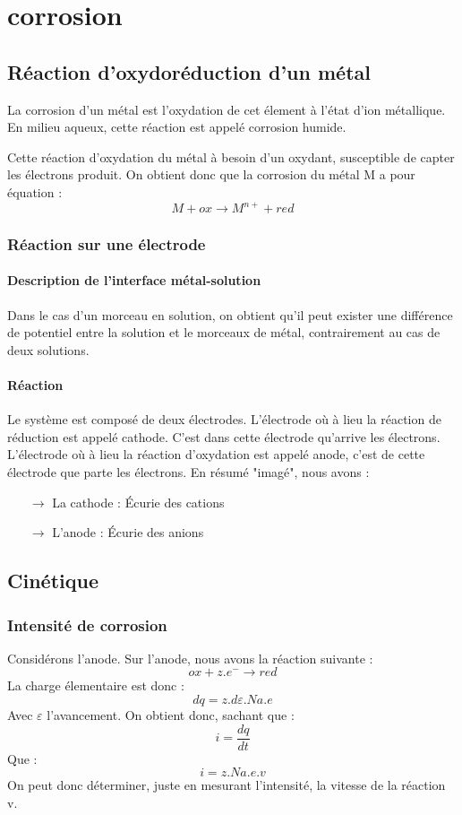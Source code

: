 \chapter{corrosion}
\section{Réaction d'oxydoréduction d'un métal}
\begin{de}
La corrosion d'un métal est l'oxydation de cet élement à l'état d'ion métallique. En milieu aqueux, cette réaction est appelé corrosion humide.
\end{de}
Cette réaction d'oxydation du métal à besoin d'un oxydant, susceptible de capter les électrons produit. On obtient donc que la corrosion du métal M a pour équation :
$$M + ox \rightarrow M^{n+} + red$$
\subsection{Réaction sur une électrode}
\subsubsection{Description de l'interface métal-solution}
Dans le cas d'un morceau en solution, on obtient qu'il peut exister une différence de potentiel entre la solution et le morceaux de métal, contrairement au cas de deux solutions.
\subsubsection{Réaction}
Le système est composé de deux électrodes. L'électrode où à lieu la réaction de réduction est appelé cathode. C'est dans cette électrode qu'arrive les électrons. L'électrode où à lieu la réaction d'oxydation est appelé anode, c'est de cette électrode que parte les électrons.
En résumé "imagé", nous avons : 
\begin{itemize}
 \item[$\rightarrow$] La cathode : Écurie des cations
 \item[$\rightarrow$] L'anode : Écurie des anions
\end{itemize}
\section{Cinétique}
\subsection{Intensité de corrosion}
Considérons l'anode. Sur l'anode, nous avons la réaction suivante : 
$$ox + z.e^- \rightarrow red$$
La charge élementaire est donc : 
$$dq = z.d\varepsilon.Na.e$$
Avec $\varepsilon$ l'avancement.
On obtient donc, sachant que : 
$$i = \frac{dq}{dt}$$
Que : 
$$i = z.Na.e.v$$
On peut donc déterminer, juste en mesurant l'intensité, la vitesse de la réaction v.
